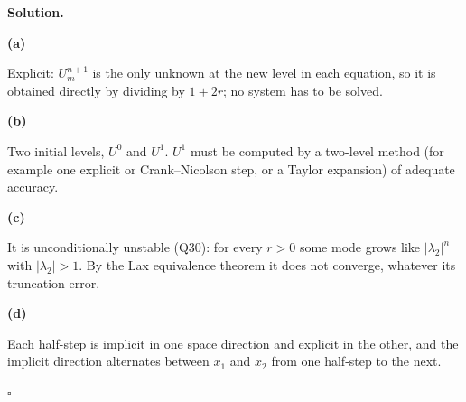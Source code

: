 \documentclass[11pt,a4paper]{article}
\newenvironment{solution}
  {\par\noindent\textbf{Solution.}\par\nobreak}
  {\par\hfill\(\square\)\par}
\newcommand{\step}[1]{\par\addvspace{0.5em}\noindent\textbf{#1}\par\nobreak}
\begin{document}
\begin{solution}
\step{(a)}
Explicit: \(U_m^{n+1}\) is the only unknown at the new level in each
equation, so it is obtained directly by dividing by \(1+2r\); no system
has to be solved.

\step{(b)}
Two initial levels, \(U^0\) and \(U^1\).  \(U^1\) must be computed by a
two-level method (for example one explicit or Crank--Nicolson step, or
a Taylor expansion) of adequate accuracy.

\step{(c)}
It is unconditionally unstable (Q30): for every \(r>0\) some mode grows
like \(|\lambda_2|^n\) with \(|\lambda_2|>1\).  By the Lax equivalence
theorem it does not converge, whatever its truncation error.

\step{(d)}
Each half-step is implicit in one space direction and explicit in the
other, and the implicit direction alternates between \(x_1\) and
\(x_2\) from one half-step to the next.
\end{solution}
\end{document}
